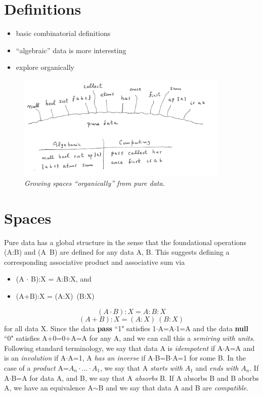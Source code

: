 \documentclass[11pt]{article}
\begin{document}
\section{Definitions}

\begin{itemize}
\item basic combinatorial definitions 
\item ``algebraic'' data is more interesting 
\item explore organically
\end{itemize} 

\begin{figure}[h]
\centering
\includegraphics[width=0.9\textwidth]{garden.png}
\caption{{\it Growing spaces ``organically'' from pure data.}}
\end{figure}

\section{Spaces}

    Pure data has a global structure in the sense that the foundational operations (A:B) and (A\ B) are defined for any data A, B.  
This suggests defining a corresponding associative product and associative sum via   
\begin{itemize}
\item[] (A $\cdot$ B):X = A:B:X, and 
\item[] (A+B):X = (A:X)\ (B:X) 
\end{itemize}
\begin{equation}
(A \cdot B):X = A:B:X 
\end{equation}
\begin{equation}
(A+B):X = (A:X)\ (B:X) 
\end{equation}
for all data X.  Since the data {\bf pass} ``1" satisfies 1$\cdot$A=A$\cdot$1=A and the data {\bf null} ``0" satisfies A+0=0+A=A for any A, and we can call this a {\it semiring with units}.  
Following standard terminology, we say that data A is {\it idempotent} if A$\cdot$A=A and is an {\it involution} if A$\cdot$A=1, A {\it has an inverse} if A$\cdot$B=B$\cdot$A=1 for some B.   
In the case of a {\it product}  A=$A_n\cdot\dots\cdot A_1$, we say that A {\it starts with} $A_1$ and {\it ends with} $A_n$.  If A$\cdot $B=A for data A, and B, we say that A {\it absorbs} B.  If A absorbs B and B aborbs A, we have an equivalence A$\sim$B and we say that data A and B are {\it compatible}.  
\end{document}
